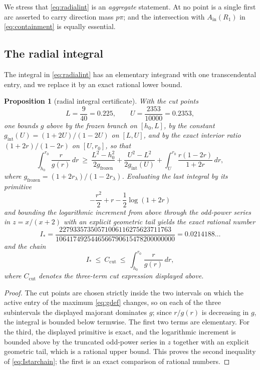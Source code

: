 \documentclass[11pt]{article}
\theoremstyle{plain}
\newtheorem{proposition}[theorem]{Proposition}
\theoremstyle{definition}
\theoremstyle{remark}
\newcommand{\Ain}{A_{\mathrm{in}}}
\newcommand{\Istar}{I_{*}}
\begin{document}
We stress that \eqref{eq:radialint} is an \emph{aggregate} statement. At no
point is a single first arc asserted to carry direction mass $p\pi$; and the
intersection with $\Ain(R_{1})$ in \eqref{eq:containment} is equally essential.

\subsection{The radial integral}

The integral in \eqref{eq:radialint} has an elementary integrand with one
transcendental entry, and we replace it by an exact rational lower bound.

\begin{proposition}[radial integral certificate]\label{prop:integral}
With the cut points
\[
  L=\frac{9}{40}=0.225,\qquad U=\frac{2353}{10000}=0.2353,
\]
one bounds $g$ above by the frozen branch on $[h_{0},L]$, by the constant
$g_{\mathrm{int}}(U)=(1+2U)/(1-2U)$ on $[L,U]$, and by the exact interior ratio
$(1+2r)/(1-2r)$ on $[U,r_{0}]$, so that
\[
  \int_{h_{0}}^{r_{0}}\frac{r}{g(r)}\,dr
  \ \ge\
  \frac{L^{2}-h_{0}^{2}}{2g_{\mathrm{frozen}}}
  +\frac{U^{2}-L^{2}}{2g_{\mathrm{int}}(U)}
  +\int_{U}^{r_{0}}\frac{r(1-2r)}{1+2r}\,dr ,
\]
where $g_{\mathrm{frozen}}=(1+2r_{\lambda})/(1-2r_{\lambda})$. Evaluating the
last integral by its primitive
\[
  -\frac{r^{2}}{2}+r-\frac12\log(1+2r)
\]
and bounding the logarithmic increment from above through the odd-power series in
$z=x/(x+2)$ with an explicit geometric tail yields the exact rational number
\begin{equation}\label{eq:Istar}
  \Istar=\frac{22793357350571006116275623711763}
              {1064174925446566790615478200000000}
  =0.0214188\ldots
\end{equation}
and the chain
\begin{equation}\label{eq:Istarchain}
  \Istar\ \le\ C_{\mathrm{cut}}\ \le\ \int_{h_{0}}^{r_{0}}\frac{r}{g(r)}\,dr ,
\end{equation}
where $C_{\mathrm{cut}}$ denotes the three-term cut expression displayed above.
\end{proposition}

\begin{proof}
The cut points are chosen strictly inside the two intervals on which the active
entry of the maximum \eqref{eq:gdef} changes, so on each of the three
subintervals the displayed majorant dominates $g$; since $r/g(r)$ is decreasing
in $g$, the integral is bounded below termwise. The first two terms are
elementary. For the third, the displayed primitive is exact, and the logarithmic
increment is bounded above by the truncated odd-power series in $z$ together
with an explicit geometric tail, which is a rational upper bound. This proves
the second inequality of \eqref{eq:Istarchain}; the first is an exact comparison
of rational numbers.
\end{proof}
\end{document}
